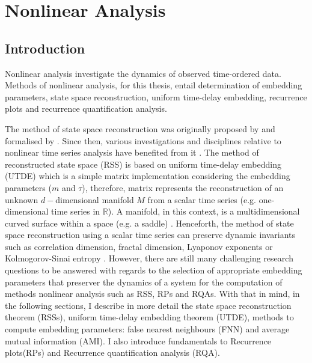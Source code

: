 \chapter{Nonlinear Analysis} \label{chapter3}

%
\graphicspath{{figs/chapter3/PDF/}}

\section{Introduction}
Nonlinear analysis investigate the dynamics of observed time-ordered data.
Methods of nonlinear analysis, for this thesis, entail determination 
of embedding parameters, state space reconstruction, uniform time-delay
embedding, recurrence plots and recurrence quantification analysis. 

The method of state space reconstruction was originally proposed by 
\cite{packard1980} and formalised by \cite{takens1981}. Since then, various 
investigations and disciplines relative to nonlinear time series analysis 
have benefited from it \citep{aguirre2009, stergiou2011, frank2010, sama2013}.
The method of reconstructed state space (RSS) is based on uniform time-delay 
embedding (UTDE) which is a simple matrix implementation considering the 
embedding 
parameters ($m$ and $\tau$), therefore, matrix represents the reconstruction
of an unknown $d-$dimensional manifold $M$ from a scalar 
time series (e.g. one-dimensional time series in $\mathbb{R}$).
A manifold, in this context, is a multidimensional curved surface within a 
space (e.g. a saddle) \citep{guastello-gregson2011}.
Henceforth, the method of state space reconstruction using a scalar time series 
can preserve dynamic invariants such as correlation dimension, 
fractal dimension, Lyaponov exponents or Kolmogorov-Sinai entropy 
\citep{bradley2015, Quintana-Duque2012, 
Quintana-Duque2013, Quintana-Duque2016, krakovska2015}.
However, 
there are still many challenging research questions to be answered  
with regards to the selection of appropriate embedding parameters 
that preserver the dynamics of a system 
for the computation of methods nonlinear analysis such as RSS, RPs and RQAs.
With that in mind, in the following sections, I describe in more 
detail the state space reconstruction theorem (RSSs), 
uniform time-delay embedding theorem (UTDE), 
methods to compute embedding parameters: 
false nearest neighbours (FNN)
and average mutual information (AMI).
I also introduce fundamentals to Recurrence plots(RPs) and 
Recurrence quantification analysis (RQA).

